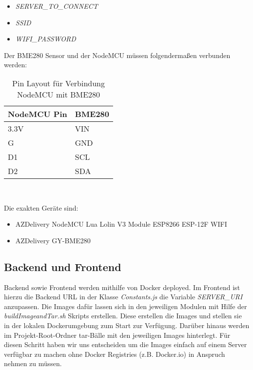 \begin{itemize}
	\item \textit{SERVER\_TO\_CONNECT}
	\item \textit{SSID}
	\item \textit{WIFI\_PASSWORD}
\end{itemize}

Der BME280 Sensor und der NodeMCU müssen folgendermaßen verbunden werden:

\begin{table}[hbt]
	\centering
    \begin{minipage}[t]{.5\textwidth}
		\caption{Pin Layout für Verbindung NodeMCU mit BME280}
		\begin{tabular}{|l|l|}
			\hline
			\textbf{NodeMCU Pin} & \textbf{BME280} \\
			\hline
			3.3V                 & VIN             \\
			\hline
			G                    & GND             \\
			\hline
			D1                   & SCL             \\
			\hline
			D2                 & SDA             \\
			\hline
	\end{tabular}
	\\
\label{tab:espBmePinout}
\end{minipage}
\end{table}

Die exakten Geräte sind:

\begin{itemize}
    \item AZDelivery NodeMCU Lua Lolin V3 Module ESP8266 ESP-12F WIFI
    \item AZDelivery GY-BME280
\end{itemize}

\subsection{Backend und Frontend}

Backend sowie Frontend werden mithilfe von Docker deployed.
Im Frontend ist hierzu die Backend URL in der Klasse \textit{Constants.js} die Variable \textit{SERVER\_URI} anzupassen.
Die Images dafür lassen sich in den jeweiligen Modulen mit Hilfe der \textit{buildImageandTar.sh} Skripts erstellen.
Diese erstellen die Images und stellen sie in der lokalen Dockerumgebung zum Start zur Verfügung.
Darüber hinaus werden im Projekt-Root-Ordner tar-Bälle mit den jeweiligen Images hinterlegt.
Für diesen Schritt haben wir uns entscheiden um die Images einfach auf einem Server verfügbar zu machen ohne Docker Registries (z.B. Docker.io) in Anspruch nehmen zu müssen.

